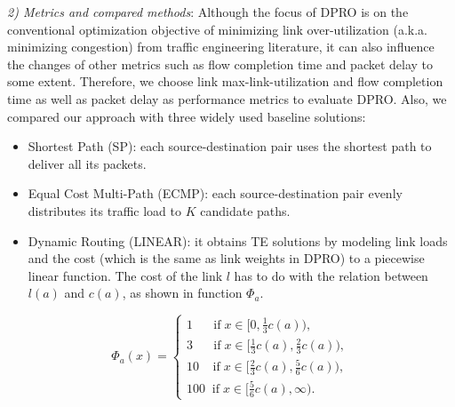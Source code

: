 \documentclass[10pt,conference]{IEEEtran}
\begin{document}
%

\emph{2) Metrics and compared methods}: Although the focus of DPRO is on the conventional optimization objective of minimizing link over-utilization (a.k.a. minimizing congestion) from traffic engineering literature, it can also influence the changes of other metrics such as flow completion time and packet delay to some extent. Therefore, we choose link max-link-utilization and flow completion time as well as packet delay as performance metrics to evaluate DPRO. Also, we compared our approach with three widely used baseline solutions:
\begin{itemize}
\item Shortest Path (SP): each source-destination pair uses the shortest path to deliver all its packets.
\item Equal Cost Multi-Path (ECMP): each source-destination pair evenly distributes its traffic load to $K$ candidate paths.
\item Dynamic Routing (LINEAR)\cite{Fortz2002}: it obtains TE solutions by modeling link loads and the cost (which is the same as link weights in DPRO) to a piecewise linear function. The cost of the link $l$ has to do with the relation between $l(a)$ and $c(a)$, as shown in function $\Phi_a$.
\end{itemize}

\begin{equation*}
\Phi_a(x)=\left\{
\begin{array}
{l}1\;\;\;\;\;\; \text{if}\;x\in\lbrack0,\frac13c(a)),
\\ 3\;\;\;\;\;\;\text{if}\;x\in\lbrack\frac13c(a),\frac23c(a)),
\\10\;\;\;\;\text{if}\;x\in\lbrack\frac23c(a),\frac56c(a)),
\\100\;\;\text{if}\;x\in\lbrack\frac56c(a),\infty).
\end{array}\right.
\end{equation*}
\end{document}

